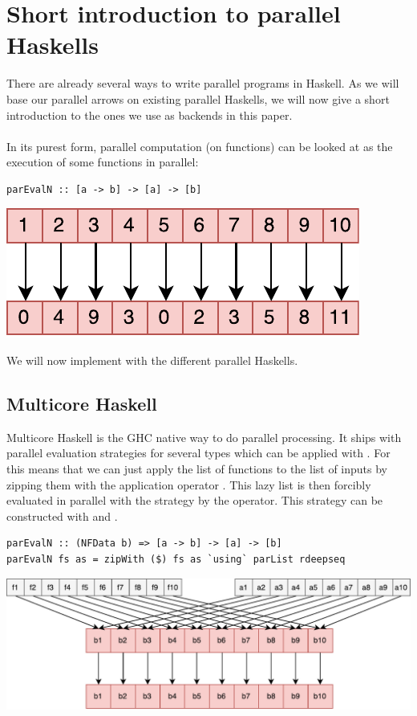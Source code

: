 \section{Short introduction to parallel Haskells}
There are already several ways to write parallel programs in Haskell. As we will base our parallel arrows on existing parallel Haskells, we will now give a short introduction to the ones we use as backends in this paper.
\\\\
In its purest form, parallel computation (on functions) can be looked at as the execution of some functions  in parallel:

\begin{lstlisting}[frame=htrbl]
parEvalN :: [a -> b] -> [a] -> [b]
\end{lstlisting}
\begin{center}
	\includegraphics[scale=0.7]{images/parEvalN}
\end{center}
We will now implement  with the different parallel Haskells.

\subsection{Multicore Haskell}
Multicore Haskell \cite{multicore_hackage} is the GHC native way to do parallel processing. It ships with parallel evaluation strategies for several types which can be applied with . For  this means that we can just apply the list of functions \code{[a -> b]} to the list of inputs \code{[a]} by zipping them with the application operator \code{\$}. This lazy list \code{[b]} is then forcibly evaluated in parallel with the strategy  by the  operator. This strategy can be constructed with  and .

\begin{lstlisting}[frame=htrbl]
parEvalN :: (NFData b) => [a -> b] -> [a] -> [b]
parEvalN fs as = zipWith ($) fs as `using` parList rdeepseq
\end{lstlisting}
\begin{center}
	\includegraphics[scale=0.5]{images/parEvalNMulticore}
\end{center}

